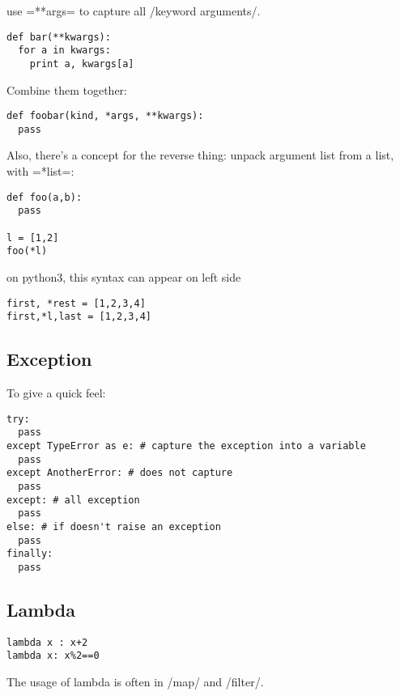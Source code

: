 use =**args= to capture all /keyword arguments/.

\begin{lstlisting}
def bar(**kwargs):
  for a in kwargs:
    print a, kwargs[a]
\end{lstlisting}

Combine them together:
\begin{lstlisting}
def foobar(kind, *args, **kwargs):
  pass
\end{lstlisting}

Also, there's a concept for the reverse thing: unpack argument list from a list, with =*list=:
\begin{lstlisting}
def foo(a,b):
  pass

l = [1,2]
foo(*l)
\end{lstlisting}

on python3, this syntax can appear on left side
\begin{lstlisting}
first, *rest = [1,2,3,4]
first,*l,last = [1,2,3,4]
\end{lstlisting}

\subsection{Exception}
To give a quick feel:
\begin{lstlisting}
try:
  pass
except TypeError as e: # capture the exception into a variable
  pass
except AnotherError: # does not capture
  pass
except: # all exception
  pass
else: # if doesn't raise an exception
  pass
finally:
  pass
\end{lstlisting}

\subsection{Lambda}
\begin{lstlisting}
lambda x : x+2
lambda x: x%2==0
\end{lstlisting}

The usage of lambda is often in /map/ and /filter/.



